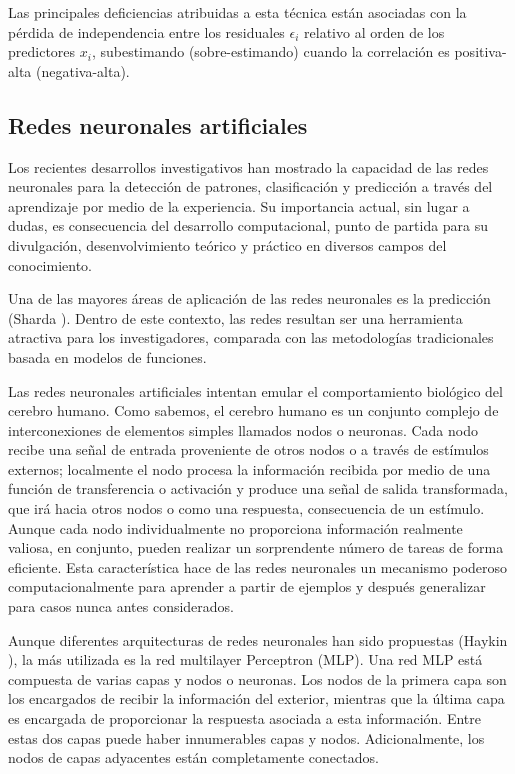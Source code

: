 \documentclass[
  12pt,
]{krantz}
\begin{document}
Las principales deficiencias atribuidas a esta técnica están asociadas con la pérdida de independencia entre los residuales \(\epsilon_{i}\) relativo al orden de los predictores \(x_{i}\), subestimando (sobre-estimando) cuando la correlación es positiva-alta (negativa-alta).

\hypertarget{redes-neuronales-artificiales}{%
\subsection{Redes neuronales artificiales}\label{redes-neuronales-artificiales}}

Los recientes desarrollos investigativos han mostrado la capacidad de las redes neuronales para la detección de patrones, clasificación y predicción a través del aprendizaje por medio de la experiencia. Su importancia actual, sin lugar a dudas, es consecuencia del desarrollo computacional, punto de partida para su divulgación, desenvolvimiento teórico y práctico en diversos campos del conocimiento.

Una de las mayores áreas de aplicación de las redes neuronales es la predicción (Sharda \cite{SH}). Dentro de este contexto, las redes resultan ser una herramienta atractiva para los investigadores, comparada con las metodologías tradicionales basada en modelos de funciones.

Las redes neuronales artificiales intentan emular el comportamiento biológico del cerebro humano. Como sabemos, el cerebro humano es un conjunto complejo de interconexiones de elementos simples llamados nodos o neuronas. Cada nodo recibe una señal de entrada proveniente de otros nodos o a través de estímulos externos; localmente el nodo procesa la información recibida por medio de una función de transferencia o activación y produce una señal de salida transformada, que irá hacia otros nodos o como una respuesta, consecuencia de un estímulo. Aunque cada nodo individualmente no proporciona información realmente valiosa, en conjunto, pueden realizar un sorprendente número de tareas de forma eficiente. Esta característica hace de las redes neuronales un mecanismo poderoso computacionalmente para aprender a partir de ejemplos y después generalizar para casos nunca antes considerados.

Aunque diferentes arquitecturas de redes neuronales han sido propuestas (Haykin \cite{Ha}), la más utilizada es la red multilayer Perceptron (MLP). Una red MLP está compuesta de varias capas y nodos o neuronas. Los nodos de la primera capa son los encargados de recibir la información del exterior, mientras que la última capa es encargada de proporcionar la respuesta asociada a esta información. Entre estas dos capas puede haber innumerables capas y nodos. Adicionalmente, los nodos de capas adyacentes están completamente conectados.
\end{document}
